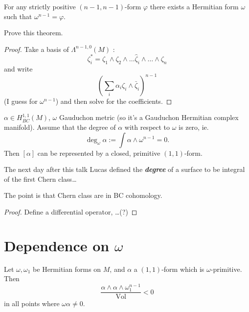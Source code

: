 \begin{thm}[Michelson]\leavevmode
	For any strictly positive $(n-1,n-1)$-form $\varphi$ there exists a Hermitian form $\omega$ such that $\omega^{n-1}=\varphi$.
\end{thm}

\begin{exercise}
	Prove this theorem.
\end{exercise}

\begin{proof}
	Take a basis of $\Lambda^{n-1,0}(M)$ :
	\[\zeta_i^* =\zeta_1\wedge \zeta_2\wedge \ldots \hat{\zeta}_i\wedge \ldots\wedge \zeta_n\]
	and write
\[\left(\sum_{i}\alpha_i\zeta_i\wedge \bar{\zeta}_i\right)^{n-1}\]
(I guess for $\omega^{n-1}$) and then solve for the coefficients.
\end{proof}

\begin{lemma}
	
\end{lemma}

\begin{lemma}[3]
	 $\alpha\in  H^{1,1}_{BC}(M)$, $\omega$ Gauduchon metric (so it's a Gauduchon Hermitian complex manifold). Assume that the degree of  $\alpha$ with respect to $\omega$ is zero, ie.
	 \[\operatorname{deg}_\omega\alpha:=\int\alpha\wedge \omega^{n-1}=0.\]
	 Then $[\alpha]$ can be represented by a closed, primitive $(1,1)$-form.
\end{lemma}

\begin{remark}
	The next day after this talk Lucas defined the \textit{\textbf{degree}} of a surface to be integral of the first Chern class…
\end{remark}

The point is that Chern class are in BC cohomology.

\begin{proof}
	Define a differential operator, …(?)
\end{proof}

\section{Dependence on $\omega$}

\begin{prop}
	Let $\omega,\omega_1$ be Hermitian forms on $M$, and $\alpha$ a $(1,1)$-form which is $\omega$-primitive. Then
	\[\frac{\alpha\wedge \alpha\wedge \omega_1^{n-1}}{\operatorname{Vol}}<0\]
	in all points where $\omega\alpha\neq 0$.
\end{prop}

